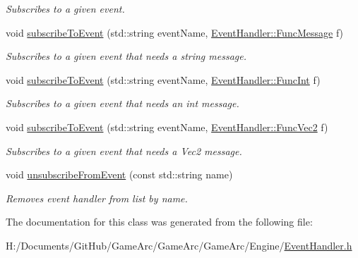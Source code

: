 \begin{DoxyCompactItemize}
\begin{DoxyCompactList}\small\item\em Subscribes to a given event. \end{DoxyCompactList}\item 
\hypertarget{class_event_ab57f906b09aeae20a7a69f5da1590438}{void \hyperlink{class_event_ab57f906b09aeae20a7a69f5da1590438}{subscribe\+To\+Event} (std\+::string event\+Name, \hyperlink{class_event_handler_a21c76d0c722afe4925c87aa3544e2ce6}{Event\+Handler\+::\+Func\+Message} f)}\label{class_event_ab57f906b09aeae20a7a69f5da1590438}

\begin{DoxyCompactList}\small\item\em Subscribes to a given event that needs a string message. \end{DoxyCompactList}\item 
\hypertarget{class_event_afe670e5b2204b2a0edd5f370440e0fe3}{void \hyperlink{class_event_afe670e5b2204b2a0edd5f370440e0fe3}{subscribe\+To\+Event} (std\+::string event\+Name, \hyperlink{class_event_handler_afc053859d1bdb89bd10f01ff22c99fed}{Event\+Handler\+::\+Func\+Int} f)}\label{class_event_afe670e5b2204b2a0edd5f370440e0fe3}

\begin{DoxyCompactList}\small\item\em Subscribes to a given event that needs an int message. \end{DoxyCompactList}\item 
\hypertarget{class_event_aa3ebd41554279bd28a5626e923be179f}{void \hyperlink{class_event_aa3ebd41554279bd28a5626e923be179f}{subscribe\+To\+Event} (std\+::string event\+Name, \hyperlink{class_event_handler_a814f37c7df5b2bf170d82904b3e525d6}{Event\+Handler\+::\+Func\+Vec2} f)}\label{class_event_aa3ebd41554279bd28a5626e923be179f}

\begin{DoxyCompactList}\small\item\em Subscribes to a given event that needs a Vec2 message. \end{DoxyCompactList}\item 
\hypertarget{class_event_a7f2fdac68d9d23f52c0d2cd657f18705}{void \hyperlink{class_event_a7f2fdac68d9d23f52c0d2cd657f18705}{unsubscribe\+From\+Event} (const std\+::string name)}\label{class_event_a7f2fdac68d9d23f52c0d2cd657f18705}

\begin{DoxyCompactList}\small\item\em Removes event handler from list by name. \end{DoxyCompactList}\end{DoxyCompactItemize}


The documentation for this class was generated from the following file\+:\begin{DoxyCompactItemize}
\item 
H\+:/\+Documents/\+Git\+Hub/\+Game\+Arc/\+Game\+Arc/\+Game\+Arc/\+Engine/\hyperlink{_event_handler_8h}{Event\+Handler.\+h}\end{DoxyCompactItemize}
